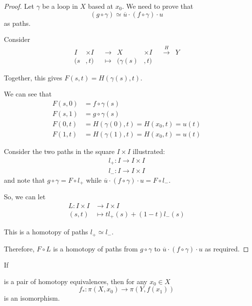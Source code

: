 \documentclass{article}
\numberwithin{nthm}{subsection}
\begin{document}
\begin{proof}
    Let $\gamma$ be a loop in $X$ based at $x_0$. We need to prove that
    \begin{equation*}
        (g \circ \gamma) \simeq \overline{u} \cdot (f \circ \gamma) \cdot u
    \end{equation*}
    as paths.

    Consider
    \begin{align*}
        I &\times I & &\to & X &\times I & &\xrightarrow{H} & Y \\
        (s&, t) & &\mapsto & (\gamma(s)&, t)
    \end{align*}

    Together, this gives $F(s, t) = H(\gamma(s), t)$.

    We can see that
    \begin{align*}
        F(s, 0) &= f \circ \gamma(s)\\
        F(s, 1) &= g \circ \gamma(s) \\
        F(0, t) &= H(\gamma(0), t) = H(x_0, t) = u(t) \\
        F(1, t) &= H(\gamma(1), t) = H(x_0, t) = u(t)
    \end{align*}

    Consider the two paths in the square $I \times I$ illustrated:
    \begin{align*}
        l_+ : I \to I \times I \\
        l_- : I \to I \times I
    \end{align*}
    and note that $g \circ \gamma = F \circ l_+$ while $\overline{u} \cdot (f \circ \gamma) \cdot u = F \circ l_-$.

    So, we can let
    \begin{align*}
        L: I \times I &\to I \times I \\
        (s, t) &\mapsto t l_+(s) + (1-t) l_-(s)
    \end{align*}

    This is a homotopy of paths $l_+ \simeq l_-$.

    Therefore, $F \circ L$ is a homotopy of paths from $g \circ \gamma$ to $\overline{u} \cdot (f \circ \gamma) \cdot u$ as required.
\end{proof}

\begin{thm}
    If
    is a pair of homotopy equivalences, then for any $x_0 \in X$
    \begin{equation*}
        f_*: \pi(X, x_0) \to \pi(Y, f(x_1))
    \end{equation*}
    is an isomorphism.
\end{thm}
\end{document}
